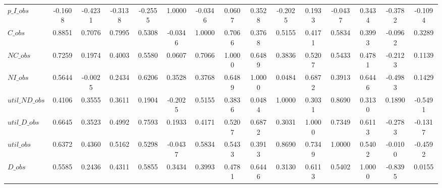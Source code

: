 \begin{center}
\begin{longtable}{lcccccccccccccc}
$p\_I\_obs      $	 & 	          -0.1608	 & 	          -0.4231	 & 	          -0.3138	 & 	          -0.2555	 & 	           1.0000	 & 	          -0.0346	 & 	           0.0607	 & 	           0.3528	 & 	          -0.2025	 & 	           0.1933	 & 	          -0.0437	 & 	           0.3434	 & 	          -0.3782	 & 	          -0.1094 \\ 
$C\_obs         $	 & 	           0.8851	 & 	           0.7076	 & 	           0.7995	 & 	           0.5308	 & 	          -0.0346	 & 	           1.0000	 & 	           0.7066	 & 	           0.3768	 & 	           0.5155	 & 	           0.4171	 & 	           0.5834	 & 	           0.3993	 & 	          -0.0962	 & 	           0.3289 \\ 
$NC\_obs        $	 & 	           0.7259	 & 	           0.1974	 & 	           0.4003	 & 	           0.5580	 & 	           0.0607	 & 	           0.7066	 & 	           1.0000	 & 	           0.6489	 & 	           0.3836	 & 	           0.5207	 & 	           0.5433	 & 	           0.4781	 & 	          -0.2123	 & 	           0.1139 \\ 
$NI\_obs        $	 & 	           0.5644	 & 	          -0.0025	 & 	           0.2434	 & 	           0.6206	 & 	           0.3528	 & 	           0.3768	 & 	           0.6489	 & 	           1.0000	 & 	           0.0484	 & 	           0.6872	 & 	           0.3913	 & 	           0.6446	 & 	          -0.4983	 & 	           0.1429 \\ 
$util\_ND\_obs  $	 & 	           0.4106	 & 	           0.3555	 & 	           0.3611	 & 	           0.1904	 & 	          -0.2025	 & 	           0.5155	 & 	           0.3836	 & 	           0.0484	 & 	           1.0000	 & 	           0.3031	 & 	           0.8690	 & 	           0.3130	 & 	           0.1890	 & 	          -0.5491 \\ 
$util\_D\_obs   $	 & 	           0.6645	 & 	           0.3523	 & 	           0.4992	 & 	           0.7593	 & 	           0.1933	 & 	           0.4171	 & 	           0.5207	 & 	           0.6872	 & 	           0.3031	 & 	           1.0000	 & 	           0.7349	 & 	           0.6113	 & 	          -0.2783	 & 	          -0.1317 \\ 
$util\_obs      $	 & 	           0.6372	 & 	           0.4360	 & 	           0.5162	 & 	           0.5298	 & 	          -0.0437	 & 	           0.5834	 & 	           0.5433	 & 	           0.3913	 & 	           0.8690	 & 	           0.7349	 & 	           1.0000	 & 	           0.5402	 & 	          -0.0100	 & 	          -0.4592 \\ 
$D\_obs         $	 & 	           0.5585	 & 	           0.2436	 & 	           0.4311	 & 	           0.5855	 & 	           0.3434	 & 	           0.3993	 & 	           0.4781	 & 	           0.6446	 & 	           0.3130	 & 	           0.6113	 & 	           0.5402	 & 	           1.0000	 & 	          -0.8395	 & 	           0.0155 \\ 

\end{longtable}
\end{center}
